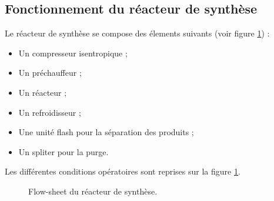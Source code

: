 \subsection{Fonctionnement du réacteur de synthèse}
Le réacteur de synthèse se compose des élements suivants 
(voir figure \ref{fig:flow-sheet-aspen}) :
\begin{itemize}
	\item Un compresseur isentropique ;
	\item Un préchauffeur ;
	\item Un réacteur ;
	\item Un refroidisseur ;
	\item Une unité flash pour la séparation des produits ;
	\item Un spliter pour la purge.
\end{itemize}
Les différentes conditions opératoires sont reprises
sur la figure \ref{fig:flow-sheet-aspen}.
\begin{figure}[ht!]
	\centering
	\caption{Flow-sheet du réacteur de synthèse.}
	\label{fig:flow-sheet-aspen}
\end{figure}

